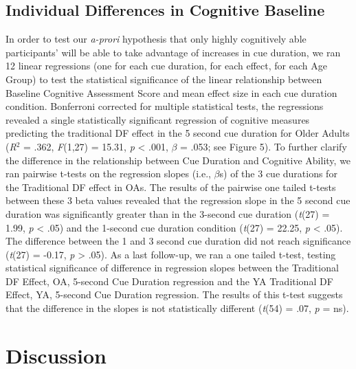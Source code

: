 \documentclass[man]{apa6}\usepackage[]{graphicx}\usepackage[]{color}
\begin{document}
\subsection*{Individual Differences in Cognitive Baseline}

In order to test our \textit{a-prori} hypothesis that only highly cognitively able participants’ will be able to take advantage of increases in cue duration, we ran 12 linear regressions (one for each cue duration, for each effect, for each Age Group) to test the statistical significance of the linear relationship between Baseline Cognitive Assessment Score and mean effect size in each cue duration condition. Bonferroni corrected for multiple statistical tests, the regressions revealed a single statistically significant regression of cognitive measures predicting the traditional DF effect in the 5 second cue duration for Older Adults (\textit{R}$^{2}$ = .362, \textit{F}(1,27) = 15.31, \textit{p} < .001, $\beta$ = .053; see Figure 5). To further clarify the difference in the relationship between Cue Duration and Cognitive Ability, we ran pairwise t-tests on the regression slopes (i.e., $\beta$s) of the 3 cue durations for the Traditional DF effect in OAs. The results of the pairwise one tailed t-tests between these 3 beta values revealed that the regression slope in the 5 second cue duration was significantly greater than in the 3-second cue duration (\textit{t}(27) = 1.99, \textit{p} < .05) and the 1-second cue duration condition (\textit{t}(27) = 22.25, \textit{p} < .05). The difference between the 1 and 3 second cue duration did not reach significance (\textit{t}(27) = -0.17, \textit{p} > .05). As a last follow-up, we ran a one tailed t-test, testing statistical significance of difference in regression slopes between the Traditional DF Effect, OA, 5-second Cue Duration regression and the YA Traditional DF Effect, YA, 5-second Cue Duration regression. The results of this t-test suggests that the difference in the slopes is not statistically different (\textit{t}(54) = .07, \textit{p} = ns).

\section*{Discussion}
\end{document}
